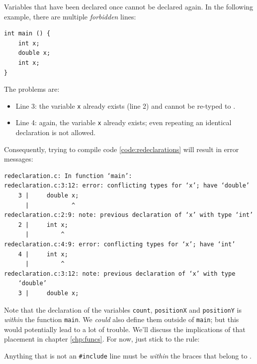 \begin{warnbox}
Variables that have been declared once cannot be declared again. In the following example, there are multiple \emph{forbidden} lines:
\vspace{3pt}

\begin{codebox}[redeclaration.c]
\begin{verbatim}
int main () {
    int x;
    double x;
    int x;
}
\end{verbatim}
 \label{code:redeclarations}
\end{codebox}
The problems are: \vspace{-6pt}
\begin{itemize}
\setlength\itemsep{-0pt}
\item Line 3: the variable \texttt{x} already exists (line 2) and cannot be re-typed to .
\item Line 4: again, the variable \texttt{x} already exists; even repeating an identical declaration is not allowed.
\end{itemize}

Consequently, trying to compile code \ref{code:redeclarations} will result in error messages:
\begin{cmdbox}
\begin{verbatim}
redeclaration.c: In function ‘main’:
redeclaration.c:3:12: error: conflicting types for ‘x’; have ‘double’
    3 |     double x;
      |            ^
redeclaration.c:2:9: note: previous declaration of ‘x’ with type ‘int’
    2 |     int x;
      |         ^
redeclaration.c:4:9: error: conflicting types for ‘x’; have ‘int’
    4 |     int x;
      |         ^
redeclaration.c:3:12: note: previous declaration of ‘x’ with type
    ‘double’
    3 |     double x;
\end{verbatim}
\end{cmdbox}
\end{warnbox}

\begin{warnbox}
Note that the declaration of the variables \texttt{count}, \texttt{positionX} and \texttt{positionY} is \emph{within} the function \texttt{main}. We \emph{could} also define them outside of \texttt{main}; but this would potentially lead to a lot of trouble. We'll discuss the implications of that placement in chapter \ref{chp:funcs}. For now, just stick to the rule:

Anything that is not an \texttt{\#include} line must be \emph{within} the braces that belong to .
\end{warnbox}


